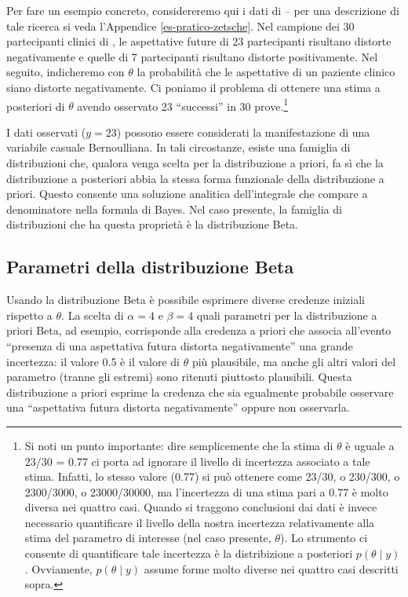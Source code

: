 \documentclass[
  11pt,
  italian,
  a4paper,
  extrafontsizes,onecolumn,openright
  ]{memoir}
\theoremstyle{definition}
\theoremstyle{definition}
\theoremstyle{definition}
\theoremstyle{definition}
\theoremstyle{remark}
\begin{document}
Per fare un esempio concreto, considereremo qui i dati di \textcite{zetschefuture2019} -- per una descrizione di tale ricerca si veda l'Appendice \ref{es-pratico-zetsche}. Nel campione dei 30 partecipanti clinici di \textcite{zetschefuture2019}, le aspettative future di 23 partecipanti risultano distorte negativamente e quelle di 7 partecipanti risultano distorte positivamente. Nel seguito, indicheremo con \(\theta\) la probabilità che le aspettative di un paziente clinico siano distorte negativamente. Ci poniamo il problema di ottenere una stima a posteriori di \(\theta\) avendo osservato 23 ``successi'' in 30 prove.\footnote{Si noti un punto importante: dire semplicemente che la stima di \(\theta\) è uguale a 23/30 = 0.77 ci porta ad ignorare il livello di incertezza associato a tale stima. Infatti, lo stesso valore (0.77) si può ottenere come 23/30, o 230/300, o 2300/3000, o 23000/30000, ma l'incertezza di una stima pari a 0.77 è molto diversa nei quattro casi. Quando si traggono conclusioni dai dati è invece necessario quantificare il livello della nostra incertezza relativamente alla stima del parametro di interesse (nel caso presente, \(\theta\)). Lo strumento ci consente di quantificare tale incertezza è la distribizione a posteriori \(p(\theta \mid y)\). Ovviamente, \(p(\theta \mid y)\) assume forme molto diverse nei quattro casi descritti sopra.}

I dati osservati (\(y = 23\)) possono essere considerati la manifestazione di una variabile casuale Bernoulliana. In tali circostanze, esiste una famiglia di distribuzioni che, qualora venga scelta per la distribuzione a priori, fa sì che la distribuzione a posteriori abbia la stessa forma funzionale della distribuzione a priori. Questo consente una soluzione analitica dell'integrale che compare a denominatore nella formula di Bayes. Nel caso presente, la famiglia di distribuzioni che ha questa proprietà è la distribuzione Beta.

\hypertarget{parametri-della-distribuzione-beta}{%
\subsection{Parametri della distribuzione Beta}\label{parametri-della-distribuzione-beta}}

Usando la distribuzione Beta è possibile esprimere diverse credenze iniziali rispetto a \(\theta\). La scelta di \(\alpha=4\) e \(\beta=4\) quali parametri per la distribuzione a priori Beta, ad esempio, corrisponde alla credenza a priori che associa all'evento ``presenza di una aspettativa futura distorta negativamente'' una grande incertezza: il valore 0.5 è il valore di \(\theta\) più plausibile, ma anche gli altri valori del parametro (tranne gli estremi) sono ritenuti piuttosto plausibili. Questa distribuzione a priori esprime la credenza che sia egualmente probabile osservare una ``aspettativa futura distorta negativamente'' oppure non osservarla.
\end{document}
